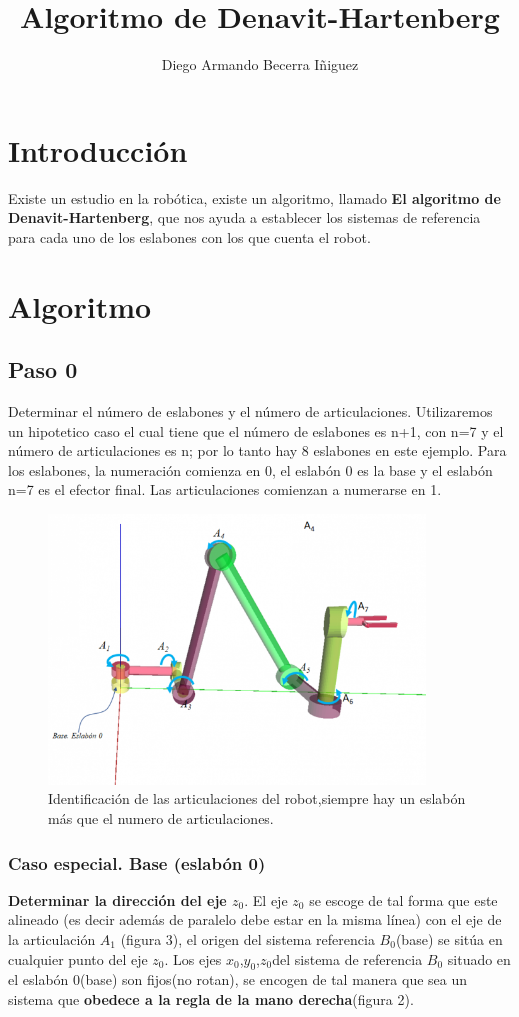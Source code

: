 \documentclass[12pt,a4paper]{report}
\author{Diego Armando Becerra Iñiguez}
\title{Algoritmo de Denavit-Hartenberg}
\begin{document}
\maketitle 
\section{Introducción}
Existe un estudio en la robótica, existe un algoritmo, llamado \textbf{El algoritmo de Denavit-Hartenberg}, que nos ayuda a establecer los sistemas de referencia para cada uno de los eslabones con los que cuenta el robot.
\section{Algoritmo}
\subsection{Paso 0}
Determinar el número de eslabones y el número de articulaciones. Utilizaremos un hipotetico caso el cual tiene que el número de eslabones es n+1, con n=7 y el número de articulaciones es n; por lo tanto hay 8 eslabones en este ejemplo. Para los eslabones, la numeración comienza en 0, el eslabón 0 es la base y el eslabón n=7 es el efector final. Las articulaciones comienzan a numerarse en 1.
\begin{figure}[hbtp]
\centering
\includegraphics[width=10cm]{1.png}
\caption{Identificación de las articulaciones del robot,siempre hay un eslabón más que el numero de articulaciones.}
\end{figure}
\subsubsection{Caso especial. Base (eslabón 0)}
\textbf{Determinar la dirección del eje $z_{0}$}.
El eje $z_{0}$ se escoge de tal forma que este alineado (es decir además de paralelo debe estar en la misma línea) con el eje de la articulación $A_{1}$ (figura 3), el origen del sistema referencia $B_{0}$(base) se sitúa en cualquier punto del eje $z_{0}$.
Los ejes \textbf{$x_{0}$},\textbf{$y_{0}$},\textbf{$z_{0}$}del sistema de referencia \textbf{$B_{0}$} situado en el eslabón 0(base) son fijos(no rotan), se encogen de tal manera que sea un sistema que \textbf{obedece a la regla de la mano derecha}(figura 2).
\end{document}
